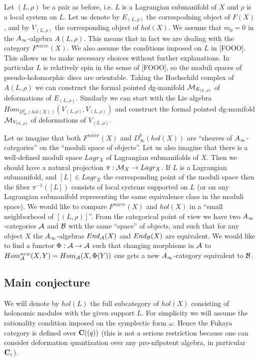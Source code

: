 \documentclass[a4paper,12pt]{article}
\begin{document}
Let $(L,\rho)$ be a pair as before, i.e.
$L$ is a Lagrangian submanifold of $X$
and $\rho$ is a local system on $L$. Let us denote by $E_{(L,\rho)}$
the correspodning object of $F(X)$, and by $V_{(L,\rho)}$ the corresponding
object of $hol(X)$. 
We assume that  $m_0=0$ in the
$A_{\infty}$-algebra $A(L,\rho)$. This means that in fact we are dealing
with the category $F^{naive}(X)$. We also assume the conditions
imposed on $L$ in [FOOO]. This allows us to make necessary
choices without further explanations. In particular $L$ is relatively spin
in the sense of [FOOO], so the moduli spaces of pseudo-holomorphic
discs are orientable. Taking the Hochschild complex of $A(L,\rho)$
we can construct the formal pointed dg-manifold ${\cal M}_{E_{(L,\rho)}}$
of deformations of $E_{(L,\rho)}$.
Similarly we can start with the Lie
 algebra $Hom_{D^{b}_{\infty}(hol(X))}(V_{(L,\rho)},V_{(L,\rho)})$
and construct the formal pointed dg-manifold
${\cal M}_{V_{(L,\rho)}}$ of deformations of $V_{(L,\rho)}$. 
 

Let us imagine that both $F^{naive}(X)$ and $D^{b}_{\infty}(hol(X))$ are ``sheaves of 
$A_{\infty}$-categories'' on the ``moduli space of objects''.
 Let us also imagine that there is
a well-defined moduli space $Lagr_X$ of Lagrangian submanifolds
of $X$. Then we should have a natural projection
$\pi:{\cal M}_X\to Lagr_X$. If $L$ is a Lagrangian submanifold,
and $[L]\in Lagr_X$ the corresponding point of the moduli space then the fiber
$\pi^{-1}([L])$ consists of local systems supported on $L$
(or on any Lagrangian submanifold representing the same equivalence class
in the moduli space). We would like to compare $F^{naive}(X)$ and $hol(X)$
in a ``small neighborhood of $[(L,\rho)]$''. From the categorical 
point of view we have two $A_{\infty}$-categories ${\cal A}$ and ${\cal B}$ with the same ``space'' of 
objects, and such that for any object $X$ the $A_{\infty}$-algebras $End_{\cal A}(X)$
and  $End_{\cal B}(X)$ are equivalent.
We would like to find a functor $\Phi:{\cal A}\to {\cal A}$ such that
changing morphisms in ${\cal A}$ to $Hom_{\cal A}^{new}(X,Y)=
Hom_{\cal A}(X,\Phi(Y))$ one gets a new $A_{\infty}$-category equivalent to ${\cal B}$.




\subsection{Main conjecture}



We will denote by $hol(L)$ the full subcategory
of $hol(X)$ consisting of holonomic modules with the given
support $L$. For simplicity we will assume the rationality condition
imposed on the symplectic form $\omega$. Hence the Fukaya category
is defined over ${\bf C}((q))$ (this is not a serious restriction because one can consider
deformation quantization over any pro-nilpotent algebra, in particular ${\bf C}_{\varepsilon}$).
\end{document}
